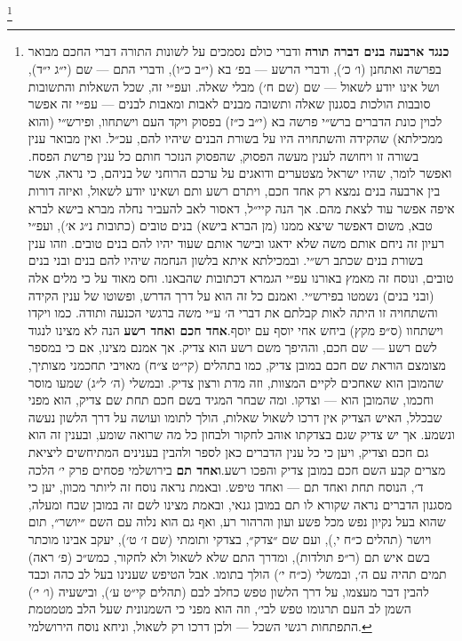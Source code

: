 \documentclass[12pt, openany]{book}
\newcommand{\footnotecomment}[1]{
	\renewcommand\thefootnote{}
	\footnote{\textsf{#1}}}
\newcommand{\commenta}[1]{\footnotecomment{#1}\hspace{0em}}
\begin{document}
\commenta{\textrm{\textbf{כנגד ארבעה בנים דברה תורה}} ודברי כולם נסמכים על לשונות התורה דברי החכם מבואר בפרשה ואתחנן (ו׳ כ׳), ודברי הרשע — בפ׳ בא (י״ב כ״ו), ודברי התם — שם (י״ג י״ד), ושל אינו יודע לשאול — שם (שם ח׳) מבלי שאלה. ועפ״י זה, שכל השאלות והתשובות סובבות הולכות בסגנון שאלה ותשובה מבנים לאבות ומאבות לבנים — עפ״י זה אפשר לכוין כונת הדברים ברש״י פרשה בא (י״ב כ״ז) בפסוק ויקד העם וישתחוו, ופירש״י (והוא ממכילתא) שהקידה והשתחויה היו על בשורת הבנים שיהיו להם, עכ״ל. ואין מבואר ענין בשורה זו ויחושה לענין מעשה הפסוק, שהפסוק הנזכר חותם כל ענין פרשת הפסח. ואפשר לומר, שהיו ישראל מצטערים ודואגים על ערכם הרוחני של בניהם, כי נראה, אשר בין ארבעה בנים נמצא רק אחד חכם, ויתרם רשע ותם ושאינו יודע לשאול, ואיזה דורות איפה אפשר עוד לצאת מהם. אך הנה קיי״ל, דאסור לאב להעביר נחלה מברא בישא לברא טבא, משום דאפשר שיצא ממנו (מן הברא בישא) בנים טובים (כתובות נ״ג א׳), ועפ״י רעיון זה ניחם אותם משה שלא ידאגו ובישר אותם שעוד יהיו להם בנים טובים. וזהו ענין בשורת בנים שכתב רש״י. ובמכילתא איתא בלשון הנחמה שיהיו להם בנים ובני בנים טובים, ונוסח זה מאמץ באורנו עפ״י הגמרא דכתובות שהבאנו. וחס מאוד על כי מלים אלה (ובני בנים) נשמטו בפירש״י. ואמנם כל זה הוא על דרך הדרש, ופשוטו של ענין הקידה והשתחויה זו היתה לאות קבלתם את דברי ה׳ ע״י משה ברגשי הכנעה ותודה. כמו ויקדו וישתחוו (ס״פ מקץ) ביחש אחי יוסף עם יוסף.\textrm{\textbf{אחד חכם ואחד רשע}} הנה לא מצינו לנגוד לשם רשע — שם חכם, וההיפך משם רשע הוא צדיק. אך אמנם מצינו, אם כי במספר מצומצם הוראת שם חכם במובן צדיק, כמו בתהלים (קי״ט צ״ח) מאויבי תחכמני מצותיך, שהמובן הוא שאחכים לקיים המצוות, וזה מדת ורצון צדיק. ובמשלי (ה׳ ל״ג) שמעו מוסר וחכמו, שהמובן הוא — וצדקו. ומה שבחר המגיד בשם חכם תחת שם צדיק, הוא מפני שבכלל, האיש הצדיק אין דרכו לשאול שאלות, הולך לתומו ועושה על דרך הלשון נעשה ונשמע. אך יש צדיק שגם בצדקתו אוהב לחקור ולבחון כל מה שרואה שומע, ובענין זה הוא גם חכם וצדיק, ויען כי כל ענין הדברים כאן לספר ולהבין בענינים המתיחשים ליציאת מצרים קבע השם חכם במובן צדיק והפכו רשע.\textrm{\textbf{ואחד תם}} בירושלמי פסחים פרק י׳ הלכה ד׳, הנוסח תחת ואחד תם — ואחד טיפש. ובאמת נראה נוסח זה ליותר מכוון, יען כי מסגנון הדברים נראה שקורא לו תם במובן גנאי, ובאמת מצינו לשם זה במובן שבח ומעלה, שהוא בעל נקיון נפש מכל פשע ועון והרהור רע, ואף גם הוא נלוה עם השם ״יושר״, תום ויושר (תהלים כ״ח י,), ועם שם ״צדק״, בצדקי ותומתי (שם ז׳ ט׳), יעקב אבינו מוכתר בשם איש תם (ר״פ תולדות), ומדרך התם שלא לשאול ולא לחקור, כמש״כ (פ׳ ראה) תמים תהיה עם ה׳, ובמשלי (כ״ח י׳) הולך בתומו. אבל הטיפש שענינו בעל לב כהה וכבד להבין דבר מעצמו, על דרך הלשון טפש כחלב לבם (תהלים קי״ט ע׳), ובישעיה (ו׳ י׳) השמן לב העם תרגומו טפש לבי׳, וזה הוא מפני כי השמנונית שעל הלב מטמטמת התפתחות רגשי השכל — ולכן דרכו רק לשאול, וניחא נוסח הירושלמי.}%
\end{document}
